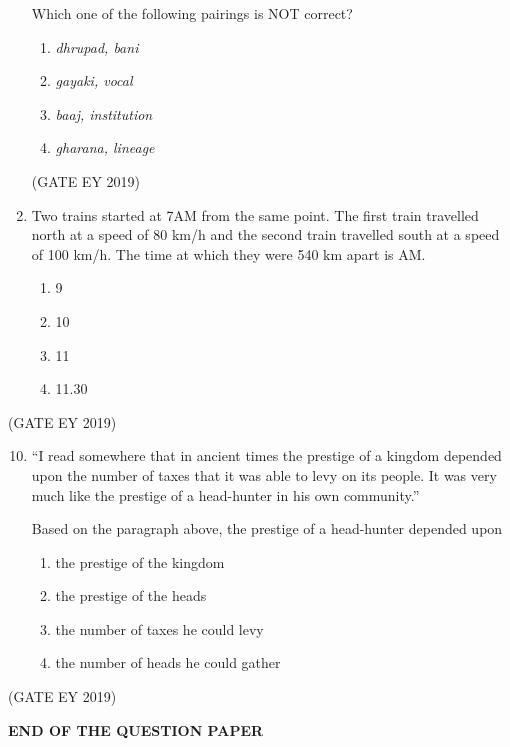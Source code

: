 \documentclass[journal,12pt,onecolumn]{IEEEtran}
\theoremstyle{remark}
\begin{document}
\begin{enumerate}
    Which one of the following pairings is NOT correct?  
    \
    \begin{enumerate}
        \item \textit{dhrupad, bani}
        \item \textit{gayaki, vocal}
        \item \textit{baaj, institution}
        \item \textit{gharana, lineage}
    \end{enumerate}
    \hfill{(GATE EY 2019)}
    
    \item Two trains started at 7AM from the same point. The first train travelled north at a speed of 80 km/h and the second train travelled south at a speed of 100 km/h. The time at which they were 540 km apart is \underline{\hspace{1.5cm}} AM.  
    \begin{multicols}{4}
    \begin{enumerate}
        \item 9
        \item 10
        \item 11
        \item 11.30
    \end{enumerate}
    \end{multicols}
\end{enumerate}\hfill{(GATE EY 2019)}

\begin{enumerate}
    \setcounter{enumi}{9} 
    \item ``I read somewhere that in ancient times the prestige of a kingdom depended upon the number of taxes that it was able to levy on its people. It was very much like the prestige of a head-hunter in his own community.''

    Based on the paragraph above, the prestige of a head-hunter depended upon \underline{\hspace{2cm}}  

    
    \begin{enumerate}
        \item the prestige of the kingdom
        \item the prestige of the heads
        \item the number of taxes he could levy
        \item the number of heads he could gather
    \end{enumerate}
    
   
\end{enumerate}
\hfill{(GATE EY 2019)}
\begin{center}
    \textbf{END OF THE QUESTION PAPER
}
\end{center}
\end{document}
